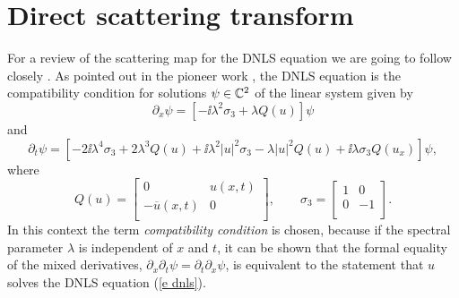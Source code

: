 \section{Direct scattering transform}\label{s scatt}
For a review of the scattering map for the DNLS equation we are going to follow closely \cite{Pelinovsky2016,Liu2016}. As pointed out in the pioneer work \cite{KaupNewell1978}, the DNLS equation is the compatibility condition for solutions $\psi\in\mathbb C^2$ of the linear system given by
\begin{equation}\label{e Lax1}
    \partial_x\psi=[-\ii\lambda^2\sigma_3+\lambda Q(u)]\psi
\end{equation}
and
\begin{equation}\label{e Lax2}
    \partial_t\psi=[-2\ii\lambda^4\sigma_3+ 2\lambda^3 Q(u)+\ii\lambda^2|u|^2\sigma_3- \lambda |u|^2Q(u) +\ii\lambda \sigma_3 Q(u_x)]\psi,
\end{equation}
where
\begin{equation*}
    Q(u)=
    \left[
      \begin{array}{cc}
        0 & u(x,t) \\
        -\overline{u}(x,t) & 0 \\
      \end{array}
    \right],\qquad
    \sigma_3=
    \left[
      \begin{array}{cc}
        1 & 0 \\
        0 & -1 \\
      \end{array}
    \right].
\end{equation*}
In this context the term \emph{compatibility condition} is chosen, because if the spectral parameter $\lambda$ is independent of $x$ and $t$, it can be shown that the formal equality of the mixed derivatives, $\partial_x\partial_t\psi=\partial_t\partial_x\psi$,  is equivalent to the statement that $u$ solves the DNLS equation (\ref{e dnls}).


%




